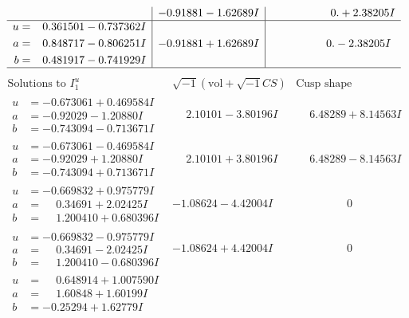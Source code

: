 \documentclass[1p]{elsarticle_modified}
\theoremstyle{definition}
\newcommand{\I}{\sqrt{-1}}
\begin{document}
$$\begin{array}{c|c|c}
 & -0.91881 - 1.62689 I & \phantom{-0.000000 -}0. + 2.38205 I \\ \hline\begin{aligned}
u &= \phantom{-}0.361501 - 0.737362 I \\
a &= \phantom{-}0.848717 - 0.806251 I \\
b &= \phantom{-}0.481917 - 0.741929 I\end{aligned}
 & -0.91881 + 1.62689 I & \phantom{-0.000000 } 0. - 2.38205 I\\
 \hline 
 \end{array}$$\newpage$$\begin{array}{c|c|c}  
\text{Solutions to }I^u_{1}& \I (\text{vol} + \sqrt{-1}CS) & \text{Cusp shape}\\
 \hline 
\begin{aligned}
u &= -0.673061 + 0.469584 I \\
a &= -0.92029 - 1.20880 I \\
b &= -0.743094 - 0.713671 I\end{aligned}
 & \phantom{-}2.10101 - 3.80196 I & \phantom{-}6.48289 + 8.14563 I \\ \hline\begin{aligned}
u &= -0.673061 - 0.469584 I \\
a &= -0.92029 + 1.20880 I \\
b &= -0.743094 + 0.713671 I\end{aligned}
 & \phantom{-}2.10101 + 3.80196 I & \phantom{-}6.48289 - 8.14563 I \\ \hline\begin{aligned}
u &= -0.669832 + 0.975779 I \\
a &= \phantom{-}0.34691 + 2.02425 I \\
b &= \phantom{-}1.200410 + 0.680396 I\end{aligned}
 & -1.08624 - 4.42004 I & \phantom{-0.000000 } 0 \\ \hline\begin{aligned}
u &= -0.669832 - 0.975779 I \\
a &= \phantom{-}0.34691 - 2.02425 I \\
b &= \phantom{-}1.200410 - 0.680396 I\end{aligned}
 & -1.08624 + 4.42004 I & \phantom{-0.000000 } 0 \\ \hline\begin{aligned}
u &= \phantom{-}0.648914 + 1.007590 I \\
a &= \phantom{-}1.60848 + 1.60199 I \\
b &= -0.25294 + 1.62779 I\end{aligned}

\end{array}$$
\end{document}
